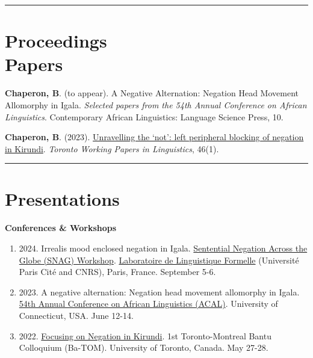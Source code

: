 \documentclass[margin,line]{resume}
\begin{document}
\begin{resume}
	\vspace{-0.7em}\rule{\textwidth}{0.4pt}


	\section{\mysidestyle Proceedings\\Papers}

	 {\textbf{Chaperon, B}. (to appear). A Negative Alternation: Negation Head Movement Allomorphy in Igala. \textit{Selected papers from the 54th Annual Conference on African Linguistics}. Contemporary African Linguistics: Language Science Press, 10.}

	 {\textbf{Chaperon, B}. (2023). \href{https://twpl.library.utoronto.ca/index.php/twpl/article/view/39257}{Unravelling the `not': left peripheral blocking of negation in Kirundi}. \textit{Toronto Working Papers in Linguistics}, 46(1).}%

	\vspace{-0.9em}\rule{\textwidth}{0.4pt}

	\newpage


	\section{\mysidestyle Presentations}

	\textbf{Conferences \& Workshops}
	\begin{enumerate}[-, leftmargin=1em, topsep=4pt]
		
		\item[] {2024. Irrealis mood enclosed negation in Igala. \href{https://parissnag.com/conf}{Sentential Negation Across the Globe (SNAG) Workshop}. \href{http://www.llf.cnrs.fr/en}{Laboratoire de Linguistique Formelle} (Université Paris Cité and CNRS), Paris, France. September 5-6.}
		
		\item[] {2023. A negative alternation: Negation head movement allomorphy in Igala. \href{https://uconnuecs.cventevents.com/event/aef2d257-6a6a-41b5-b83d-2c6efc60aac5/summary}{54th Annual Conference on African Linguistics (ACAL)}. University of Connecticut, USA. June 12-14.}
		
		\item[] {2022. \href{https://mcling.blogs.mcgill.ca/2022/05/24/mcgill-at-ba-tom-1/}{Focusing on Negation in Kirundi}. 1st Toronto-Montreal Bantu Colloquium (Ba-TOM). University of Toronto, Canada. May 27-28.}
	\end{enumerate}
	


\end{resume}
\end{document}
